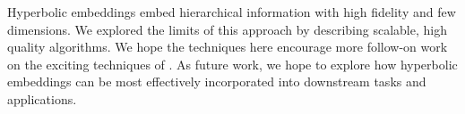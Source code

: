 
Hyperbolic embeddings embed hierarchical information with high
fidelity and few dimensions. We explored the limits of this approach
by describing scalable, high quality algorithms. We hope the
techniques here encourage more follow-on work on the exciting
techniques of \citet{fb, ucl}. As future work, we hope to explore how
hyperbolic embeddings can be most effectively incorporated into downstream
tasks and applications.
